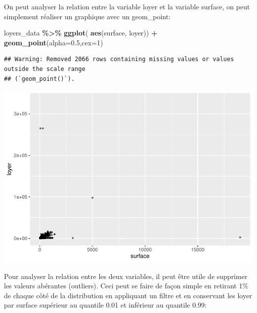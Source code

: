 \documentclass[
]{book}
\newenvironment{Shaded}{\begin{snugshade}}{\end{snugshade}}
\newcommand{\AttributeTok}[1]{\textcolor[rgb]{0.13,0.29,0.53}{#1}}
\newcommand{\DecValTok}[1]{\textcolor[rgb]{0.00,0.00,0.81}{#1}}
\newcommand{\FloatTok}[1]{\textcolor[rgb]{0.00,0.00,0.81}{#1}}
\newcommand{\FunctionTok}[1]{\textcolor[rgb]{0.13,0.29,0.53}{\textbf{#1}}}
\newcommand{\NormalTok}[1]{#1}
\newcommand{\SpecialCharTok}[1]{\textcolor[rgb]{0.81,0.36,0.00}{\textbf{#1}}}
\begin{document}
On peut analyser la relation entre la variable loyer et la variable
surface, on peut simplement réaliser un graphique avec un geom\_point:

\begin{Shaded}
\begin{Highlighting}[]
\NormalTok{loyers\_data }\SpecialCharTok{\%\textgreater{}\%}
\FunctionTok{ggplot}\NormalTok{( }\FunctionTok{aes}\NormalTok{(surface, loyer)) }\SpecialCharTok{+}
  \FunctionTok{geom\_point}\NormalTok{(}\AttributeTok{alpha=}\FloatTok{0.5}\NormalTok{,}\AttributeTok{cex=}\DecValTok{1}\NormalTok{)}
\end{Highlighting}
\end{Shaded}

\begin{verbatim}
## Warning: Removed 2066 rows containing missing values or values outside the scale range
## (`geom_point()`).
\end{verbatim}

\includegraphics{manuel_geo_quanti_files/figure-latex/unnamed-chunk-4-1.pdf}

Pour analyser la relation entre les deux variables, il peut être utile
de supprimer les valeurs abérantes (outliers). Ceci peut se faire de
façon simple en retirant 1\% de chaque côté de la distribution en
appliquant un filtre et en conservant les loyer par surface supérieur au
quantile 0.01 et inférieur au quantile 0.99:
\end{document}
